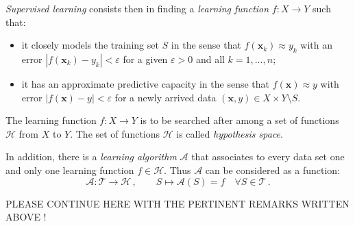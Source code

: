 \begin{description}[style=unboxed,leftmargin=0cm,itemsep=3ex]
\begin{enumerate}
{{\em Supervised learning\/} consists then in finding a
{\em learning function\/} $f:X\to Y$ such that:


\begin{itemize}
\item
it closely models the training set $S$ in the sense that
$f(\mathbf{x}_k)\approx y_k$ with an error
$|f(\mathbf{x}_k)-y_k|<\varepsilon$ for a given $\varepsilon>0$
and all $k=1,\dots,n$;
\item
it has an approximate predictive capacity in the sense that
$f(\mathbf{x})\approx y$ with error $|f(\mathbf{x})-y|<\varepsilon$
for a newly arrived data $(\mathbf{x},y)\in X\times Y\setminus S$.
\end{itemize}
The learning function $f:X\to Y$ is to be searched after among a set
of functions $\mathscr{H}$ from $X$ to $Y$.
The set of functions $\mathscr{H}$ is called {\em hypothesis space\/}.


In addition, there is a {\em learning algorithm\/} $\mathcal{A}$ that
associates to every data set one and only one learning function
$f\in\mathscr{H}$.
Thus $\mathcal{A}$ can be considered as a function:
$$
\mathcal{A}:\mathscr{T}\to\mathscr{H}\,,\qquad
S\mapsto\mathcal{A}(S)=f\quad\forall S\in\mathscr{T}\,.
$$ 

PLEASE CONTINUE HERE WITH THE PERTINENT REMARKS WRITTEN ABOVE !

}

\end{enumerate}

\end{description}


